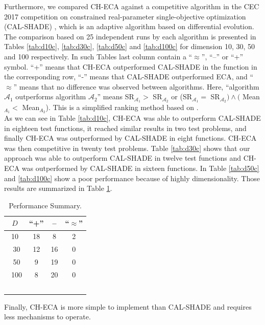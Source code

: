 \documentclass[conference]{IEEEtran}
\begin{document}
Furthermore, we compared CH-ECA against a  competitive algorithm in 
the CEC 2017 competition on constrained real-parameter single-objective optimization (CAL-SHADE) \cite{zamuda2017adaptive}, which is an adaptive algorithm based on differential evolution. The comparison based on 25 independent runs by each algorithm is presented in Tables \ref{tab:d10c}, \ref{tab:d30c}, \ref{tab:d50c} and \ref{tab:d100c} for dimension 10, 30, 50 and 100 respectively. In such Tables last column contain a ``$\approx$'', ``--'' or ``+'' symbol. ``+'' means that CH-ECA outperformed CAL-SHADE in the function  %
	in the corresponding row, ``-'' means that CAL-SHADE outperformed ECA, and  %
	``$\approx$'' means that no difference was observed between algorithms. Here, ``algorithm $\mathcal{A}_1$ outperforms algorithm $\mathcal{A}_2$'' means SR$_{\mathcal{A}_1} > $ SR$_{\mathcal{A}_2}$ or (SR$_{\mathcal{A}_1} = $ SR$_{\mathcal{A}_2}) \wedge ($ Mean$_{A_1} < $ Mean$_{A_2}$). This is a simplified ranking method based on \cite{cecCop17}. \\

As we can see in Table \ref{tab:d10c}, CH-ECA was able to outperform CAL-SHADE in eighteen test functions, it reached similar results in two test problems, and finally CH-ECA was outperformed by CAL-SHADE in eight functions. CH-ECA was then competitive in twenty test problems. %
%
Table \ref{tab:d30c} shows that our approach was able to outperform CAL-SHADE in twelve test functions and CH-ECA was outperformed by CAL-SHADE in sixteen functions.
%
In Table \ref{tab:d50c} and \ref{tab:d100c} show a poor performance because of highly dimensionality. Those results are summarized in Table \ref{tab:summary}.

\begin{table}[!ht]
	\caption{Performance Summary.}
	\label{tab:summary}
	\centering
	\begin{tabular}{c|ccc}
		$D$ & ``+'' &  -- & ``$\approx$'' \\ \hline
		10  & 18    &  8  & 2  \\ \
		30  & 12    &  16 & 0  \\ \
		50  & 9     &  19 & 0 \\ \
	   100  & 8     &  20 & 0  \\ \
	\end{tabular}
\end{table}


Finally, CH-ECA is more simple to implement than CAL-SHADE and requires less 
mechanisms to operate.
\end{document}
